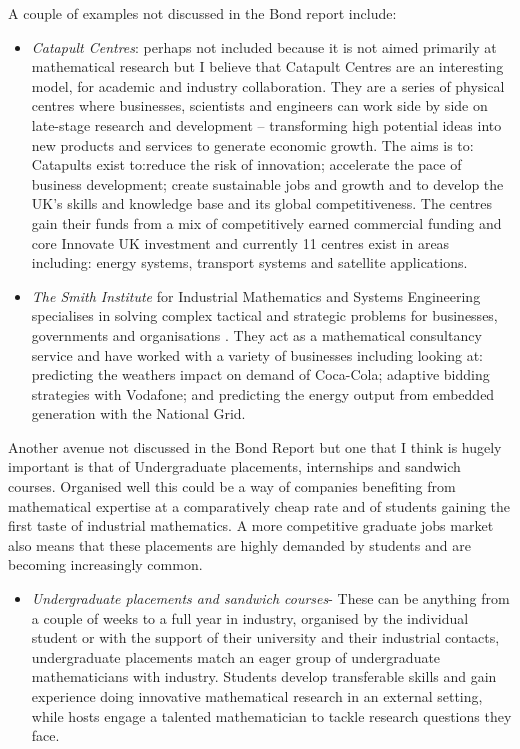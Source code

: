 \documentclass[11pt]{article} %
\begin{document}
A couple of examples not discussed in the Bond report include:
\begin{itemize}
	\item \textit{Catapult Centres}: perhaps not included because it is not aimed primarily at mathematical research but I believe that Catapult Centres are an interesting model, for academic and industry collaboration. They are a series of physical centres where  businesses, scientists and engineers can work side by side on late-stage research and development – transforming high potential ideas into new products and services to generate economic growth.  The aims is to:  Catapults exist to:reduce the risk of innovation; 	accelerate the pace of business development;  create sustainable jobs and growth and to	develop the UK's skills and knowledge base and its global competitiveness. The centres gain their funds from a mix of competitively earned commercial funding and core Innovate UK investment and currently 11 centres exist in areas including: energy systems, transport systems and satellite applications. 
	\item \textit{The Smith Institute} for Industrial Mathematics and Systems Engineering specialises in solving complex tactical and strategic problems for businesses, governments and organisations \cite{Smith}. They act as a mathematical consultancy service and have worked with a variety of businesses including looking at:  predicting the weathers impact on demand of Coca-Cola; adaptive bidding strategies with Vodafone; and predicting the energy output from embedded generation with the National Grid. 
\end{itemize}
Another avenue not discussed in the Bond Report but one that I think is hugely important is that of Undergraduate placements, internships and sandwich courses. Organised well this could be a way of companies benefiting from mathematical expertise at a comparatively cheap rate and of students gaining the first taste of industrial mathematics. A more competitive graduate jobs market also means that these placements are highly demanded by students and are becoming increasingly common. 
\begin{itemize}
	\item \textit{Undergraduate placements and sandwich courses}- These can be anything from a couple of weeks to a full year in industry, organised by the individual student or with the support of their university and their industrial contacts, undergraduate placements match an eager group of undergraduate mathematicians with industry. Students develop transferable skills and gain experience doing innovative mathematical research in an external setting, while hosts engage a talented mathematician to tackle research questions they face.
\end{itemize}
\end{document}
